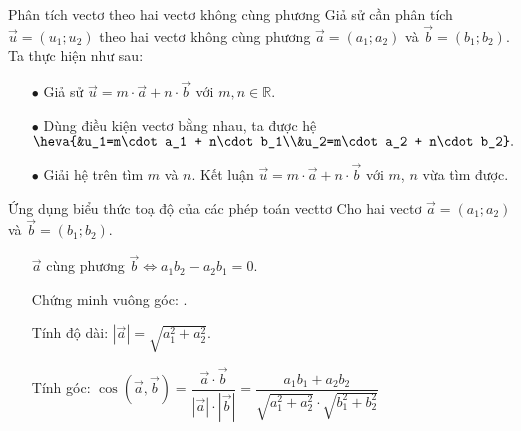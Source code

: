 \begin{dang}{Phân tích vectơ theo hai vectơ không cùng phương}
	Giả sử cần phân tích $\vec{u}=(u_1;u_2)$ theo hai vectơ không cùng phương $\vec{a}=(a_1;a_2)$ và $\vec{b}=(b_1;b_2)$. Ta thực hiện như sau:
	\begin{itemize}
		\item [$\bullet$] Giả sử $\vec{u} =m \cdot \vec{a} + n \cdot \vec{b}$ với $m,n \in \mathbb{R}$.
		\item [$\bullet$] Dùng điều kiện vectơ bằng nhau, ta được hệ
		$\heva{&u_1=m\cdot a_1 + n\cdot b_1\\&u_2=m\cdot a_2 + n\cdot b_2}.$
		\item [$\bullet$] Giải hệ trên tìm $m$ và $n$. Kết luận $\vec{u} =m \cdot \vec{a} + n \cdot \vec{b}$ với $m$, $n$ vừa tìm được.
	\end{itemize}	
\end{dang}

\begin{dang}{Ứng dụng biểu thức toạ độ của các phép toán vecttơ}
	Cho hai vectơ $\overrightarrow{a}=\left( a_1;a_2 \right)$ và $\overrightarrow{b}=\left( b_1;b_2\right)$.  
	\begin{itemize}
		\item [\ding{172}] $\overrightarrow{a}$ cùng phương $\overrightarrow{b} \Leftrightarrow a_1b_2-a_2b_1=0$.
		\item [\ding{173}] Chứng minh vuông góc: .  
		\item [\ding{174}] Tính độ dài: $\boxed{|\overrightarrow{a}|=\sqrt{a_1^2+a_2^2}}$.
		\item [\ding{175}] Tính góc: $\boxed{\cos\left(\overrightarrow{a},\overrightarrow{b}\right)=\dfrac{\overrightarrow{a}\cdot \overrightarrow{b}}{|\overrightarrow{a}|\cdot\left|\overrightarrow{b}\right|}=\dfrac{a_1b_1+a_2b_2}{\sqrt{a_1^2+a_2^2}\cdot \sqrt{b_1^2+b_2^2}}}$ 
	\end{itemize}
\end{dang}


